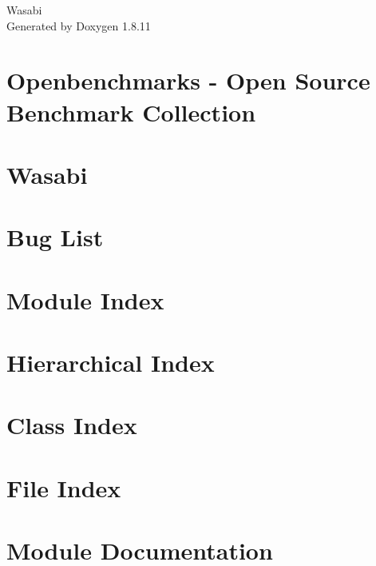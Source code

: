 \documentclass[twoside]{book}
\newcommand{\+}{\discretionary{\mbox{\scriptsize$\hookleftarrow$}}{}{}}
\newcommand{\clearemptydoublepage}{%
  \newpage{\pagestyle{empty}\cleardoublepage}%
}
\begin{document}
\hypersetup{pageanchor=false,
             bookmarksnumbered=true,
             pdfencoding=unicode
            }
\begin{titlepage}
\vspace*{7cm}
\begin{center}%
{\Large Wasabi }\\
\vspace*{1cm}
{\large Generated by Doxygen 1.8.11}\\
\end{center}
\end{titlepage}
\clearemptydoublepage
\tableofcontents
\clearemptydoublepage
{}
\hypersetup{pageanchor=true}

\chapter{Openbenchmarks -\/ Open Source Benchmark Collection}
\label{index}\hypertarget{index}{}
\chapter{Wasabi}
\label{md_README}
\hypertarget{md_README}{}

\chapter{Bug List}
\label{bug}
\hypertarget{bug}{}

\chapter{Module Index}

\chapter{Hierarchical Index}

\chapter{Class Index}

\chapter{File Index}

\chapter{Module Documentation}


\end{document}
